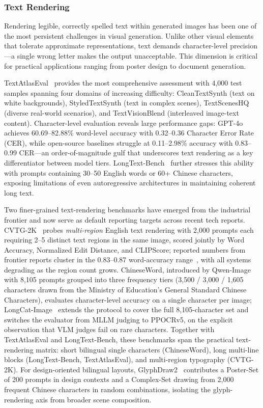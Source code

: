 \subsubsection{Text Rendering}

Rendering legible, correctly spelled text within generated images has been one of the most persistent challenges in visual generation. Unlike other visual elements that tolerate approximate representations, text demands character-level precision---a single wrong letter makes the output unacceptable. This dimension is critical for practical applications ranging from poster design to document generation.

TextAtlasEval~\citep{TextAtlas5M} provides the most comprehensive assessment with 4,000 test samples spanning four domains of increasing difficulty: CleanTextSynth (text on white backgrounds), StyledTextSynth (text in complex scenes), TextScenesHQ (diverse real-world scenarios), and TextVisionBlend (interleaved image-text content). Character-level evaluation reveals large performance gaps: GPT-4o achieves 60.69--82.88\% word-level accuracy with 0.32--0.36 Character Error Rate (CER), while open-source baselines struggle at 0.11--2.98\% accuracy with 0.83--0.99 CER---an order-of-magnitude gulf that underscores text rendering as a key differentiator between model tiers. LongText-Bench~\citep{X-Omni} further stresses this ability with prompts containing 30--50 English words or 60+ Chinese characters, exposing limitations of even autoregressive architectures in maintaining coherent long text.

Two finer-grained text-rendering benchmarks have emerged from the industrial frontier and now serve as default reporting targets across recent tech reports. CVTG-2K~\citep{tai2025investigating} probes \emph{multi-region} English text rendering with 2{,}000 prompts each requiring 2--5 distinct text regions in the same image, scored jointly by Word Accuracy, Normalized Edit Distance, and CLIPScore; reported numbers from frontier reports cluster in the 0.83--0.87 word-accuracy range~\citep{wu2025qwen, cai2025z, team2025longcat, jdjoyaiimage}, with all systems degrading as the region count grows. ChineseWord, introduced by Qwen-Image~\citep{wu2025qwen} with 8{,}105 prompts grouped into three frequency tiers (3{,}500 / 3{,}000 / 1{,}605 characters drawn from the Ministry of Education's General Standard Chinese Characters), evaluates character-level accuracy on a single character per image; LongCat-Image~\citep{team2025longcat} extends the protocol to cover the full 8{,}105-character set and switches the evaluator from MLLM judging to PPOCRv5, on the explicit observation that VLM judges fail on rare characters. Together with TextAtlasEval and LongText-Bench, these benchmarks span the practical text-rendering matrix: short bilingual single characters (ChineseWord), long multi-line blocks (LongText-Bench, TextAtlasEval), and multi-region typography (CVTG-2K). For design-oriented bilingual layouts, GlyphDraw2~\citep{ma2025glyphdraw2} contributes a Poster-Set of 200 prompts in design contexts and a Complex-Set drawing from 2{,}000 frequent Chinese characters in random combinations, isolating the glyph-rendering axis from broader scene composition.

